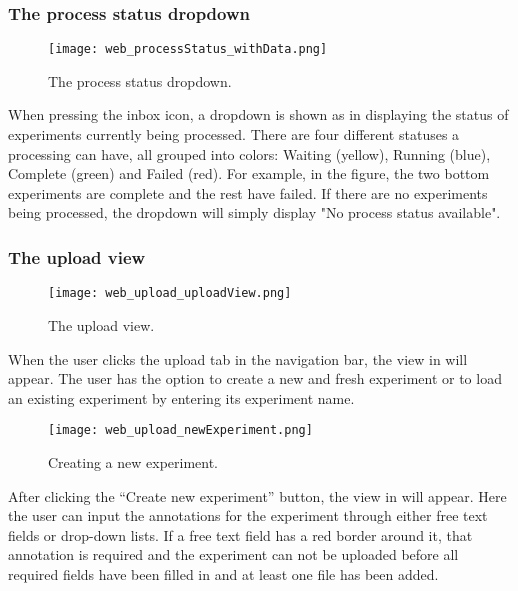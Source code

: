 \subsubsection{The process status dropdown}
\begin{figure}[h]
\centering
\texttt{[image: web\_processStatus\_withData.png]}
\caption{\label{fig:web_processStatus_withData}The process status dropdown.}
\end{figure}
\FloatBarrier
When pressing the inbox icon, a dropdown is shown as in  displaying the status of experiments currently being processed. There are four different statuses a processing can have, all grouped into colors: Waiting (yellow), Running (blue), Complete (green) and Failed (red). For example, in the figure, the two bottom experiments are complete and the rest have failed. If there are no experiments being processed, the dropdown will simply display "No process status available".

\subsubsection{The upload view}

\begin{figure}[h]
\centering
\texttt{[image: web\_upload\_uploadView.png]}
\caption{\label{fig:web_upload_uploadView}The upload view.}
\end{figure}

When the user clicks the upload tab in the navigation bar, the view in  will appear. The user has the option to create a new and fresh experiment or to load an existing experiment by entering its experiment name. 

\begin{figure}[h]
\centering
\texttt{[image: web\_upload\_newExperiment.png]}
\caption{\label{fig:web_upload_newExperiment}Creating a new experiment.}
\end{figure}

After clicking the “Create new experiment” button, the view in  will appear. Here the user can input the annotations for the experiment through either free text fields or drop-down lists. If a free text field has a red border around it, that annotation is required and the experiment can not be uploaded before all required fields have been filled in and at least one file has been added.

